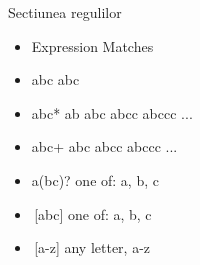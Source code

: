 \documentclass[pdf]{beamer}
\begin{document}
\begin{frame}{Sectiunea regulilor}
\begin{itemize}
\item
Expression \hspace{20mm} Matches
\item
abc \hspace{28mm} abc

\item
abc* \hspace{26mm} ab abc abcc abccc ...

\item
abc+ \hspace{25mm} abc abcc abccc ... 

\item
a(bc)?  \hspace{22mm} one of: a, b, c 

\item
\,[abc] \hspace{28mm} one of: a, b, c

\item
\,[a-z] \hspace{28mm} any letter, a-z 

\end{itemize}
\end{frame}
\end{document}
